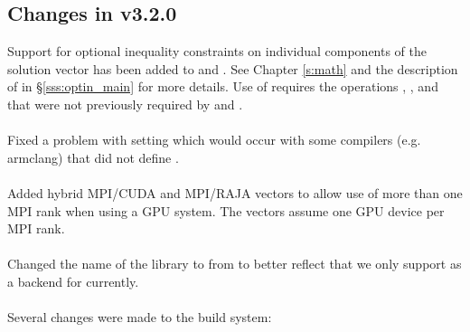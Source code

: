 \subsection*{Changes in v3.2.0}

Support for optional inequality constraints on individual components of the
solution vector has been added to {\cvode} and {\cvodes}. See Chapter
\ref{s:math} and the description of  in
\S\ref{sss:optin_main} for more details. Use of 
requires the {\nvector} operations , , and
 that were not previously required by {\cvode} and {\cvodes}.
\\
\\
\noindent Fixed a problem with setting  which would occur
with some compilers (e.g. armclang) that did not define .
\\
\\
\noindent Added hybrid MPI/CUDA and MPI/RAJA vectors to allow use of more
than one MPI rank when using a GPU system.  The vectors assume one GPU
device per MPI rank.
\\
\\
\noindent Changed the name of the {\raja} {\nvector} library to
 from \newline
{} to better reflect that we only support {\cuda}
as a backend for {\raja} currently.
\\
\\
\noindent Several changes were made to the build system:
